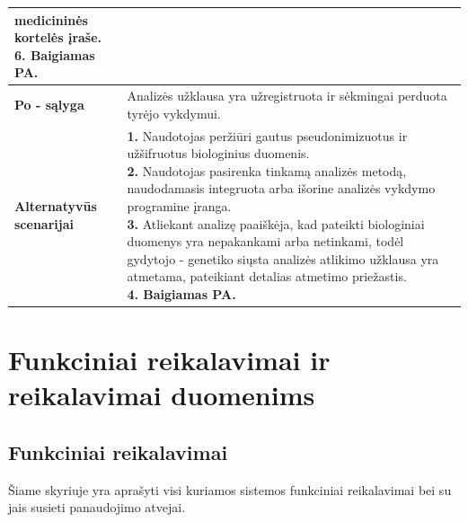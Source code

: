 \documentclass[12pt]{article}
\begin{document}
\begin{table}[htb!]
\begin{tabular}{|m{3cm}|m{13.7cm}|}
{{            medicininės kortelės įraše. \\
            \textbf{6. Baigiamas PA.}
        }}
        \\
        \hline
        \raggedleft \textbf{\cellcolor{deepchampagne}Po - sąlyga} &
        Analizės užklausa yra užregistruota ir sėkmingai perduota tyrėjo
        vykdymui. \\
        \hline
        \raggedleft \textbf{\cellcolor{deepchampagne}Alternatyvūs scenarijai} &
        \vskip 5pt
        \makecell[l]{\parbox[t]{13.7cm}{
            \textbf{1.} \textcolor{dartmouthgreen}{Naudotojas peržiūri gautus
            pseudonimizuotus ir užšifruotus biologinius duomenis.} \\
            \textbf{2.} \textcolor{dartmouthgreen}{Naudotojas pasirenka tinkamą
            analizės metodą, naudodamasis integruota arba išorine analizės
            vykdymo programine įranga.} \\
            \textbf{3.} \textcolor{dartmouthgreen}{Atliekant analizę paaiškėja,
            kad pateikti biologiniai duomenys yra nepakankami arba netinkami,
            todėl gydytojo - genetiko siųsta analizės atlikimo užklausa yra
            atmetama, pateikiant detalias atmetimo priežastis.} \\
            \textbf{4. Baigiamas PA.}
        }}
        \\
        \hline
    \end{tabular}
\end{table}

\newpage

\section{Funkciniai reikalavimai ir reikalavimai duomenims}
\subsection{Funkciniai reikalavimai}
Šiame skyriuje yra aprašyti visi kuriamos sistemos funkciniai reikalavimai bei
su jais susieti panaudojimo atvejai.

\vskip 10pt
\end{document}
